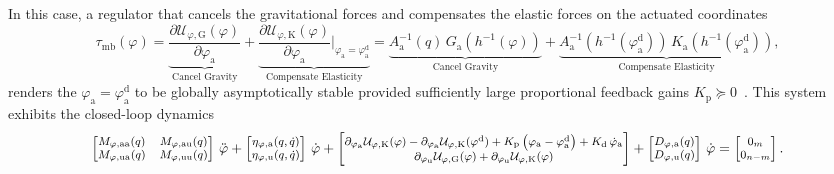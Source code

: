 In this case, a regulator that cancels the gravitational forces and compensates the elastic forces on the actuated coordinates
\begin{equation}
    \tau_\mathrm{mb}(\varphi) = \underbrace{\frac{\partial \mathcal{U}_{\varphi,\mathrm{G}}(\varphi)}{\partial \varphi_\mathrm{a}}}_\text{Cancel Gravity} + \underbrace{\frac{\partial \mathcal{U}_{\varphi,\mathrm{K}}(\varphi)}{\partial \varphi_\mathrm{a}} \bigg |_{\varphi_\mathrm{a}=\varphi_\mathrm{a}^\mathrm{d}}}_\text{Compensate Elasticity} = \underbrace{A_\mathrm{a}^{-1}(q) \, G_\mathrm{a}(h^{-1}(\varphi))}_\text{Cancel Gravity} + \underbrace{A_\mathrm{a}^{-1}(h^{-1}(\varphi_\mathrm{a}^\mathrm{d})) \, K_\mathrm{a}(h^{-1}(\varphi_\mathrm{a}^\mathrm{d}))}_\text{Compensate Elasticity},
\end{equation}
renders the $\varphi_\mathrm{a} = \varphi_\mathrm{a}^\mathrm{d}$ to be globally asymptotically stable provided sufficiently large proportional feedback gains $K_\mathrm{p} \succeq 0$~\citep{pustina2025analysis}.
This system exhibits the closed-loop dynamics
\begin{equation}\footnotesize
    \begin{bmatrix}
        M_{\varphi,\mathrm{aa}}(q) & M_{\varphi,\mathrm{au}}(q)\\ 
        M_{\varphi,\mathrm{ua}}(q) & M_{\varphi,\mathrm{uu}}(q)
    \end{bmatrix} \, \ddot{\varphi} + \begin{bmatrix}
        \eta_{\varphi,\mathrm{a}}(q,\dot{q})\\ \eta_{\varphi,\mathrm{u}}(q,\dot{q})
    \end{bmatrix} \, \dot{\varphi} + \begin{bmatrix}
       \partial_{\varphi_\mathrm{a}} \mathcal{U}_{\varphi,\mathrm{K}}(\varphi) - \partial_{\varphi_\mathrm{a}} \mathcal{U}_{\varphi,\mathrm{K}}(\varphi^\mathrm{d}) + K_\mathrm{p} \left ( \varphi_\mathrm{a} - \varphi^\mathrm{d}_\mathrm{a} \right ) + K_\mathrm{d} \, \dot{\varphi}_\mathrm{a}\\
       \partial_{\varphi_\mathrm{u}} \mathcal{U}_{\varphi,\mathrm{G}}(\varphi) + \partial_{\varphi_\mathrm{u}} \mathcal{U}_{\varphi,\mathrm{K}}(\varphi)
    \end{bmatrix} + \begin{bmatrix}
        D_{\varphi,\mathrm{a}}(q)\\
        D_{\varphi,\mathrm{u}}(q)
    \end{bmatrix} \, \dot{\varphi} = \begin{bmatrix}
        0_m\\ 0_{n-m}
    \end{bmatrix}.
\end{equation}
